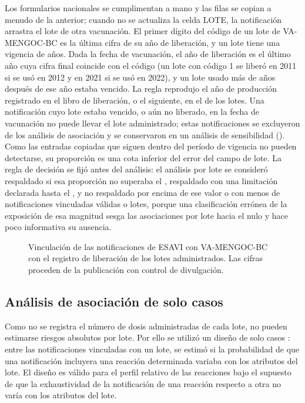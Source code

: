 \documentclass[11pt]{article}
\begin{document}
Los formularios nacionales se cumplimentan a mano y las filas se copian a menudo de la anterior;
cuando no se actualiza la celda LOTE, la notificación arrastra el lote de otra vacunación. El primer
dígito del código de un lote de VA-MENGOC-BC es la última cifra de su año de liberación, y un lote
tiene una vigencia de \PTShelfLife{} años. Dada la fecha de vacunación, el año de liberación es el
último año cuya cifra final coincide con el código (un lote con código 1 se liberó en 2011 si se usó
en 2012 y en 2021 si se usó en 2022), y un lote usado más de \PTShelfLife{} años después de ese año
estaba vencido. La regla reprodujo el año de producción registrado en el libro de liberación, o el
siguiente, en el \PTCodeRuleAgreement{} de los lotes. Una notificación cuyo lote estaba vencido, o
aún no liberado, en la fecha de vacunación no puede llevar el lote administrado; estas notificaciones
se excluyeron de los análisis de asociación y se conservaron en un análisis de sensibilidad
(). Como las entradas copiadas que siguen dentro del período de vigencia no pueden
detectarse, su proporción es una cota inferior del error del campo de lote. La regla de decisión se
fijó antes del análisis: el análisis por lote se consideró respaldado si esa proporción no superaba
el \PTFeasCautionPct, respaldado con una limitación declarada hasta el \PTFeasMaxPct, y no
respaldado por encima de ese valor o con menos de \PTFeasMinReports{} notificaciones vinculadas
válidas o \PTFeasMinLots{} lotes, porque una clasificación errónea de la exposición de esa magnitud
sesga las asociaciones por lote hacia el nulo y hace poco informativa su ausencia.

\begin{figure}[tbp]
\centering
\LinkageFlow
\caption{Vinculación de las notificaciones de ESAVI con VA-MENGOC-BC con el registro de liberación
de los lotes administrados. Las cifras proceden de la publicación con control de divulgación.}
\label{fig:flow}
\end{figure}

\subsection{Análisis de asociación de solo casos}\label{sec:m-assoc}
Como no se registra el número de dosis administradas de cada lote, no pueden estimarse riesgos
absolutos por lote. Por ello se utilizó un diseño de solo casos \cite{Piegorsch1994}: entre las
notificaciones vinculadas con un lote, se estimó si la probabilidad de que una notificación incluyera
una reacción determinada variaba con los atributos del lote. El diseño es válido para el perfil
relativo de las reacciones bajo el supuesto de que la exhaustividad de la notificación de una
reacción respecto a otra no varía con los atributos del lote.
\end{document}
